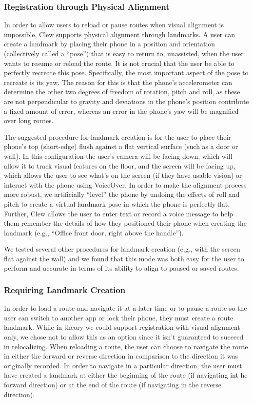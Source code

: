 \documentclass[chi_draft]{sigchi}
\begin{document}
\subsubsection{Registration through Physical Alignment}

In order to allow users to reload or pause routes when visual alignment is impossible, Clew supports physical alignment through landmarks.  A user can create a landmark by placing their phone in a position and orientation (collectively called a ``pose'') that is easy to return to, unassisted, when the user wants to resume or reload the route.  It is not crucial that the user be able to perfectly recreate this pose.  Specifically, the most important aspect of the pose to recreate is its yaw.  The reason for this is that the phone's accelerometer can determine the other two degrees of freedom of rotation, pitch and roll, as these are not perpendicular to gravity and deviations in the phone's position contribute a fixed amount of error, whereas an error in the phone's yaw will be magnified over long routes.

The suggested procedure for landmark creation is for the user to place their phone's top (short-edge) flush against a flat vertical surface (such as a door or wall).  In this configuration the user's camera will be facing down, which will allow it to track visual features on the floor, and the screen will be facing up, which allows the user to see what's on the screen (if they have usable vision) or interact with the phone using VoiceOver.  In order to make the alignment process more robust, we artificially ``level'' the phone by undoing the effects of roll and pitch to create a virtual landmark pose in which the phone is perfectly flat.  Further, Clew allows the user to enter text or record a voice message to help them remember the details of how they positioned their phone when creating the landmark (e.g., ``Office front door, right above the handle'').

We tested several other procedures for landmark creation (e.g., with the screen flat against the wall) and we found that this mode was both easy for the user to perform and accurate in terms of its ability to align to paused or saved routes.

\subsubsection{Requiring Landmark Creation}

In order to load a route and navigate it at a later time or to pause a route so the user can switch to another app or lock their phone, they must create a route landmark.  While in theory we could support registration with visual alignment only, we chose not to allow this as an option since it isn't guaranteed to succeed in relocalizing.  When reloading a route, the user can choose to navigate the route in either the forward or reverse direction in comparison to the direction it was originally recorded.  In order to navigate in a particular direction, the user must have created a landmark at either the beginning of the route (if navigating int he forward direction) or at the end of the route (if navigating in the reverse direction).
\end{document}
